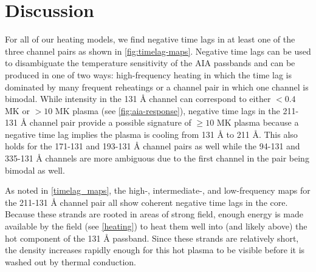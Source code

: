 
\section{Discussion}\label{discussion}

For all of our heating models, we find negative time lags in at least one of the three channel pairs as shown in \autoref{fig:timelag-maps}. Negative time lags can be used to disambiguate the temperature sensitivity of the AIA passbands and can be produced in one of two ways: high-frequency heating in which the time lag is dominated by many frequent reheatings or a channel pair in which one channel is bimodal. While intensity in the 131 \AA{} channel can correspond to either $<0.4$ MK or $>10$ MK plasma (see \autoref{fig:aia-response}), negative time lags in the 211-131 \AA{} channel pair provide a possible signature of $\ge10$ MK plasma because a negative time lag implies the plasma is cooling from 131 \AA{} to 211 \AA{}. This also holds for the 171-131 and 193-131 \AA{} channel pairs as well while the 94-131 and 335-131 \AA{} channels are more ambiguous due to the first channel in the pair being bimodal as well.

As noted in \autoref{timelag_maps}, the high-, intermediate-, and low-frequency maps for the 211-131 \AA{} channel pair all show coherent negative time lags in the core.  Because these strands are rooted in areas of strong field, enough energy is made available by the field (see \autoref{heating}) to heat them well into (and likely above) the hot component of the 131 \AA{} passband. Since these strands are relatively short, the density increases rapidly enough for this hot plasma to be visible before it is washed out by thermal conduction. 

